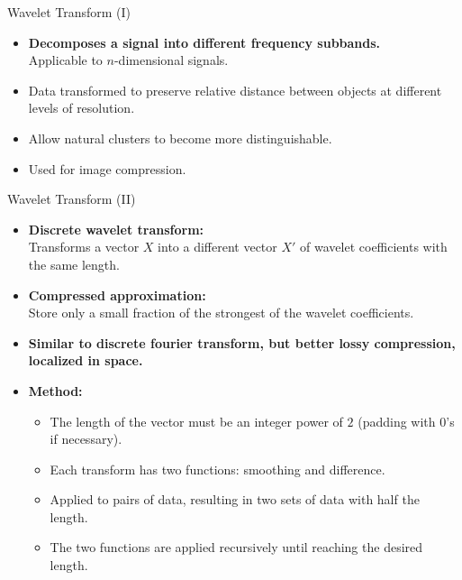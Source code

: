 \begin{frame}{Wavelet Transform (I)}
	\begin{minipage}[t]{0.55\textwidth}
		\begin{itemize}
			\item \textbf{Decomposes a signal into different frequency 
				subbands.}\\
			Applicable to $n$-dimensional signals.
			\item Data transformed to preserve relative distance between 
			objects at different levels of resolution.
			\item Allow natural clusters to become more distinguishable.
			\item Used for image compression.
		\end{itemize}
	\end{minipage}\hspace{1cm}
	\begin{minipage}[t]{0.30\textwidth}
	\end{minipage}
\end{frame}

\begin{frame}{Wavelet Transform (II)}
	\begin{itemize}
		\item \textbf{Discrete wavelet transform:}\\
		Transforms a vector $X$ into a different vector $X'$ of wavelet 
		coefficients with the same length.
		\item \textbf{Compressed approximation:}\\
		Store only a small fraction of the strongest of the wavelet 
		coefficients.
		\item \textbf{Similar to discrete fourier transform, but better lossy 
		compression, localized in space.}
		\item \textbf{Method:}
		\begin{itemize}
			\item The length of the vector must be an integer power of $2$ 
			(padding with $0$'s if necessary).
			\item Each transform has two functions: smoothing and difference.
			\item Applied to pairs of data, resulting in two sets of data with 
			half the length.
			\item The two functions are applied recursively until reaching the 
			desired length.
		\end{itemize}
	\end{itemize}
\end{frame}

